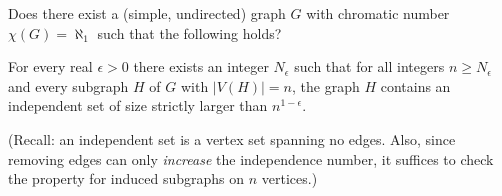 Does there exist a (simple, undirected) graph $G$ with chromatic number $\chi(G)=\aleph_1$ such that the following holds?

For every real $\epsilon>0$ there exists an integer $N_\epsilon$ such that for all integers $n\ge N_\epsilon$ and every subgraph $H$ of $G$ with $\lvert V(H)\rvert=n$, the graph $H$ contains an independent set of size strictly larger than $n^{1-\epsilon}$.

(Recall: an independent set is a vertex set spanning no edges. Also, since removing edges can only \emph{increase} the independence number, it suffices to check the property for induced subgraphs on $n$ vertices.)
